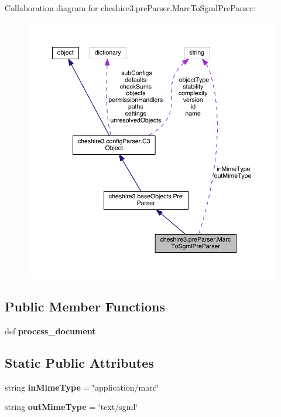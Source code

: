 Collaboration diagram for cheshire3.\-pre\-Parser.\-Marc\-To\-Sgml\-Pre\-Parser\-:
\nopagebreak
\begin{figure}[H]
\begin{center}
\leavevmode
\includegraphics[width=350pt]{classcheshire3_1_1pre_parser_1_1_marc_to_sgml_pre_parser__coll__graph}
\end{center}
\end{figure}
\subsection*{Public Member Functions}
\begin{DoxyCompactItemize}
\item 
\hypertarget{classcheshire3_1_1pre_parser_1_1_marc_to_sgml_pre_parser_a7b50b677c59770a1ae7adb8371ddd8ca}{def {\bfseries process\-\_\-document}}\label{classcheshire3_1_1pre_parser_1_1_marc_to_sgml_pre_parser_a7b50b677c59770a1ae7adb8371ddd8ca}

\end{DoxyCompactItemize}
\subsection*{Static Public Attributes}
\begin{DoxyCompactItemize}
\item 
\hypertarget{classcheshire3_1_1pre_parser_1_1_marc_to_sgml_pre_parser_a86b3a515b4e220ba71e3b447f618a1ed}{string {\bfseries in\-Mime\-Type} = \char`\"{}application/marc\char`\"{}}\label{classcheshire3_1_1pre_parser_1_1_marc_to_sgml_pre_parser_a86b3a515b4e220ba71e3b447f618a1ed}

\item 
\hypertarget{classcheshire3_1_1pre_parser_1_1_marc_to_sgml_pre_parser_a1750ea349780e99b521f8ed228460b09}{string {\bfseries out\-Mime\-Type} = \char`\"{}text/sgml\char`\"{}}\label{classcheshire3_1_1pre_parser_1_1_marc_to_sgml_pre_parser_a1750ea349780e99b521f8ed228460b09}

\end{DoxyCompactItemize}

